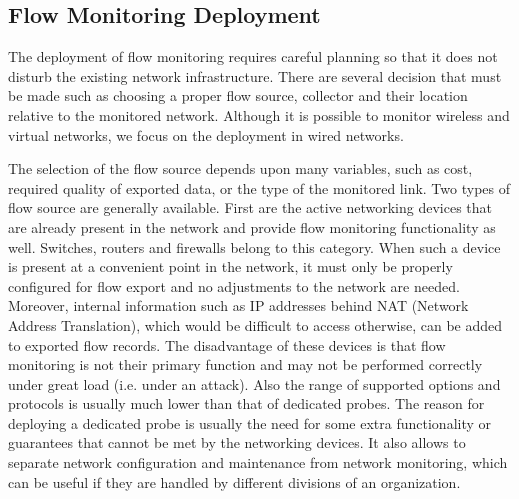 \subsection{Flow Monitoring Deployment}

The deployment of flow monitoring requires careful planning so that it does not disturb the existing network infrastructure. There are several decision that must be made such as choosing a proper flow source, collector and their location relative to the monitored network. Although it is possible to monitor wireless and virtual networks, we focus on the deployment in wired networks.

The selection of the flow source depends upon many variables, such as cost, required quality of exported data, or the type of the monitored link. Two types of flow source are generally available. First are the active networking devices that are already present in the network and provide flow monitoring functionality as well. Switches, routers and firewalls belong to this category. When such a device is present at a convenient point in the network, it must only be properly configured for flow export and no adjustments to the network are needed. Moreover, internal information such as IP addresses behind NAT (Network Address Translation), which would be difficult to access otherwise, can be added to exported flow records. The disadvantage of these devices is that flow monitoring is not their primary function and may not be performed correctly under great load (i.e. under an attack). Also the range of supported options and protocols is usually much lower than that of dedicated probes. The reason for deploying a dedicated probe is usually the need for some extra functionality or guarantees that cannot be met by the networking devices. It also allows to separate network configuration and maintenance from network monitoring, which can be useful if they are handled by different divisions of an organization.

